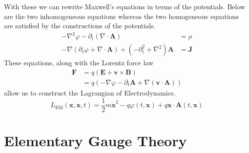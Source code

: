 With these we can rewrite Maxwell's equations in terms of the potentials. Below
are the two inhomogeneous equations whereas the two homogeneous equations are
satisfied by the constructions of the potentials.
\begin{align}
    -\nabla ^{2}\varphi - \partial_t (\nabla \cdot \mathbf{A})                                & = \rho       \label{eq:maxPot1} \\
    -\nabla(\partial_t\varphi + \nabla\cdot\mathbf{A}) + (-\partial_t^2 + \nabla^2)\mathbf{A} & = \mathbf{J} \label{eq:maxPot2}
\end{align}
These equations, along with the Lorentz force law
\begin{align}\label{eq:lorentz}
    \mathbf{F} & = q\left(\mathbf{E} + \mathbf{v}\times\mathbf{B}\right) \nonumber\\
               & = q\left(-\nabla\varphi - \partial_t\mathbf{A} + \nabla(\mathbf{v}\cdot\mathbf{A})\right)
\end{align}
allow us to construct the Lagrangian of Electrodynamics.
\begin{equation}\label{eq:lagEM}
    L_\text{EM}(\mathbf{x}, \dot{\mathbf{x}},t) = \frac{1}{2}m\dot{\mathbf{x}}^2 - q\varphi(t,\mathbf{x}) + q\dot{\mathbf{x}}\cdot\mathbf{A}(t,\mathbf{x})
\end{equation}


\section{Elementary Gauge Theory}

